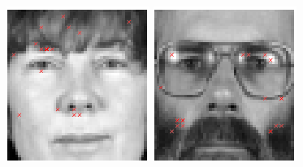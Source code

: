 \begin{figure}[ht]
\begin{center}
\includegraphics[width=\textwidth/9]{ch4/figures/NoC7.png}
\includegraphics[width=\textwidth/9]{ch4/figures/NoC8.png}\\

\end{center}
\end{figure}
